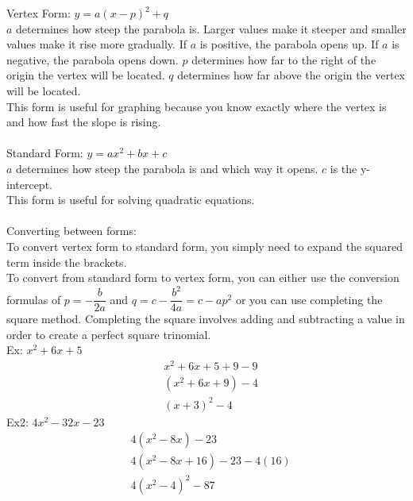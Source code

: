 \documentclass[11pt, fleqn]{article}
\begin{document}
Vertex Form: $y=a(x-p)^2+q$\\
$a$ determines how steep the parabola is. Larger values make it steeper and smaller values make it rise more gradually. If $a$ is positive, the parabola opens up. If $a$ is negative, the parabola opens down. $p$ determines how far to the right of the origin the vertex will be located. $q$ determines how far above the origin the vertex will be located.\\
This form is useful for graphing because you know exactly where the vertex is and how fast the slope is rising.\\
\\
Standard Form: $y=ax^2+bx+c$\\
$a$ determines how steep the parabola is and which way it opens. $c$ is the y-intercept.\\
This form is useful for solving quadratic equations.\\
\\
Converting between forms:\\
To convert vertex form to standard form, you simply need to expand the squared term inside the brackets.\\
To convert from standard form to vertex form, you can either use the conversion formulas of $p=-\dfrac{b}{2a}$ and $q=c-\dfrac{b^2}{4a}=c-ap^2$ or you can use completing the square method. Completing the square involves adding and subtracting a value in order to create a perfect square trinomial.\\
Ex: $x^2+6x+5$
\begin{align*}
    &x^2+6x+5+9-9\\
    &(x^2+6x+9)-4\\
    &(x+3)^2-4
\end{align*}
Ex2: $4x^2-32x-23$
\begin{align*}
    &4(x^2-8x)-23\\
    &4(x^2-8x+16)-23-4(16)\\
    &4(x^2-4)^2-87
\end{align*}
\end{document}
